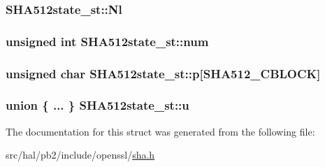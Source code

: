 \subsubsection[{\texorpdfstring{Nl}{Nl}}]{ S\+H\+A512state\+\_\+st\+::\+Nl}\hypertarget{struct_s_h_a512state__st_a8adc6d1037d156b3adcb14773fa8fe90}{}\label{struct_s_h_a512state__st_a8adc6d1037d156b3adcb14773fa8fe90}
\subsubsection[{\texorpdfstring{num}{num}}]{\setlength{\rightskip}{0pt plus 5cm}unsigned int S\+H\+A512state\+\_\+st\+::num}\hypertarget{struct_s_h_a512state__st_ae3ba23906ed2416ed3fae1765cf3c0f0}{}\label{struct_s_h_a512state__st_ae3ba23906ed2416ed3fae1765cf3c0f0}
\subsubsection[{\texorpdfstring{p}{p}}]{\setlength{\rightskip}{0pt plus 5cm}unsigned char S\+H\+A512state\+\_\+st\+::p\mbox{[}{\bf S\+H\+A512\+\_\+\+C\+B\+L\+O\+CK}\mbox{]}}\hypertarget{struct_s_h_a512state__st_ac374088935867ed28c9210a4ce44e754}{}\label{struct_s_h_a512state__st_ac374088935867ed28c9210a4ce44e754}
\subsubsection[{\texorpdfstring{u}{u}}]{\setlength{\rightskip}{0pt plus 5cm}union \{ ... \}   S\+H\+A512state\+\_\+st\+::u}\hypertarget{struct_s_h_a512state__st_aa4c28febb7375750361c9494620ba773}{}\label{struct_s_h_a512state__st_aa4c28febb7375750361c9494620ba773}


The documentation for this struct was generated from the following file\+:\begin{DoxyCompactItemize}
\item 
src/hal/pb2/include/openssl/\hyperlink{sha_8h}{sha.\+h}\end{DoxyCompactItemize}
